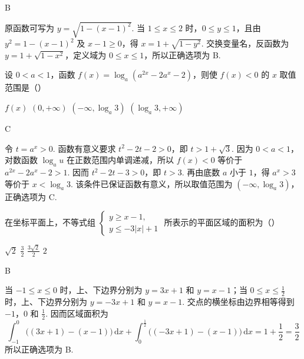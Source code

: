 \begin{answer}
B
\end{answer}

\begin{solution}
原函数可写为 \(y=\sqrt{1-(x-1)^{2}}\). 当 \(1\leqslant x\leqslant2\) 时，\(0\leqslant y\leqslant1\)，且由 \(y^{2}=1-(x-1)^{2}\) 及 \(x-1\geqslant0\)，得 \(x=1+\sqrt{1-y^{2}}\). 交换变量名，反函数为 \(y=1+\sqrt{1-x^{2}}\)，定义域为 \(0\leqslant x\leqslant1\)，所以正确选项为 B.
\end{solution}

\begin{problem}
设 \(0<a<1\)，函数 \(f(x)=\log_a(a^{2x}-2a^x-2)\)，则使 \(f(x)<0\) 的 \(x\) 取值范围是（\quad）

\choices
    {\(f(x)\)}
    {\((0, +\infty)\)}
    {\((-\infty, \log_a 3)\)}
    {\((\log_a 3, +\infty)\)}
\end{problem}

\begin{answer}
C
\end{answer}

\begin{solution}
令 \(t=a^{x}>0\).  函数有意义要求 \(t^{2}-2t-2>0\)，即 \(t>1+\sqrt{3}\).  因为 \(0<a<1\)，对数函数 \(\log_a u\) 在正数范围内单调递减，所以 \(f(x)<0\) 等价于 \(a^{2x}-2a^x-2>1\).  因而 \(t^{2}-2t-3>0\)，即 \(t>3\).  再由底数 \(a\) 小于 \(1\)，得 \(a^x>3\) 等价于 \(x<\log_a3\).  该条件已保证函数有意义，所以取值范围为 \((-\infty,\log_a3)\)，正确选项为 C.
\end{solution}

\begin{problem}
在坐标平面上，不等式组 \(\begin{cases}
y\geqslant x-1,\\
y\leqslant-3|x|+1
\end{cases}\) 所表示的平面区域的面积为（\quad）

\choices
    {\(\sqrt{2}\)}
    {\(\frac{3}{2}\)}
    {\(\frac{3\sqrt{2}}{2}\)}
    {\(2\)}
\end{problem}

\begin{answer}
B
\end{answer}

\begin{solution}
当 \(-1\leqslant x\leqslant0\) 时，上、下边界分别为 \(y=3x+1\) 和 \(y=x-1\)；当 \(0\leqslant x\leqslant\frac{1}{2}\) 时，上、下边界分别为 \(y=-3x+1\) 和 \(y=x-1\).  交点的横坐标由边界相等得到 \(-1\)，\(0\) 和 \(\frac{1}{2}\). 因而区域面积为
\[
\int_{-1}^{0}\bigl((3x+1)-(x-1)\bigr)\,\mathrm{d}x+\int_{0}^{\frac{1}{2}}\bigl((-3x+1)-(x-1)\bigr)\,\mathrm{d}x=1+\frac{1}{2}=\frac{3}{2}
\]
所以正确选项为 B.
\end{solution}

